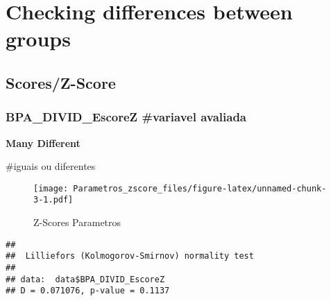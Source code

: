 \documentclass[
]{article}
\newenvironment{Shaded}{\begin{snugshade}}{\end{snugshade}}
\newcommand{\AttributeTok}[1]{\textcolor[rgb]{0.13,0.29,0.53}{#1}}
\newcommand{\DecValTok}[1]{\textcolor[rgb]{0.00,0.00,0.81}{#1}}
\newcommand{\FunctionTok}[1]{\textcolor[rgb]{0.13,0.29,0.53}{\textbf{#1}}}
\newcommand{\NormalTok}[1]{#1}
\newcommand{\SpecialCharTok}[1]{\textcolor[rgb]{0.81,0.36,0.00}{\textbf{#1}}}
\newcommand{\StringTok}[1]{\textcolor[rgb]{0.31,0.60,0.02}{#1}}
\begin{document}
\section{\texorpdfstring{\textbf{Checking differences between
groups}}{Checking differences between groups}}\label{checking-differences-between-groups-1}

\subsection{\texorpdfstring{\textbf{Scores/Z-Score}}{Scores/Z-Score}}\label{scoresz-score-1}

\subsubsection{BPA\_DIVID\_EscoreZ \#variavel
avaliada}\label{bpa_divid_escorez-variavel-avaliada}

\textbf{Many Different}

\#iguais ou diferentes

\begin{Shaded}
\end{Shaded}

\begin{figure}
\centering
\texttt{[image: Parametros\_zscore\_files/figure-latex/unnamed-chunk-3-1.pdf]}
\caption{Z-Scores Parametros}
\end{figure}

\begin{Shaded}
\end{Shaded}

\begin{verbatim}
## 
##  Lilliefors (Kolmogorov-Smirnov) normality test
## 
## data:  data$BPA_DIVID_EscoreZ
## D = 0.071076, p-value = 0.1137
\end{verbatim}

\begin{Shaded}
\end{Shaded}
\end{document}
